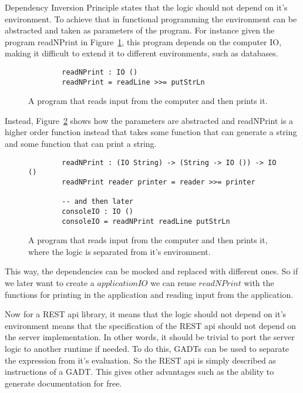 Dependency Inversion Principle states that the logic should not depend on it's
environment. To achieve that in functional programming the environment can
be abstracted and taken as parameters of the program. For instance given the
program readNPrint in Figure~\ref{diexample}, this program depends on the
computer IO, making it difficult to extend it to different environments, such as
databases. 

\begin{figure}[H]
    \begin{lstlisting}
        readNPrint : IO () 
        readNPrint = readLine >>= putStrLn
    \end{lstlisting}
    \caption{A program that reads input from the computer and then prints it.}
    \label{diexample}
\end{figure}

Instead, Figure~\ref{withdiexample} shows how the parameters are abstracted and
readNPrint is a higher order function instead that takes some function that
can generate a string and some function that can print a string.


\begin{figure}[H]
    \begin{lstlisting}
        readNPrint : (IO String) -> (String -> IO ()) -> IO ()
        readNPrint reader printer = reader >>= printer

        -- and then later
        consoleIO : IO ()
        consoleIO = readNPrint readLine putStrLn
    \end{lstlisting}
    \caption{A program that reads input from the computer and then prints it,
    where the logic is separated from it's environment.}
    \label{withdiexample}
\end{figure}

This way, the dependencies can be mocked and replaced with different ones. So if
we later want to create a $applicationIO$ we can reuse $readNPrint$ with the
functions for printing in the application and reading input from the
application.

Now for a REST api library, it means that the logic should not depend on it's
environment means that the specification of the REST api should not depend on
the server implementation. In other words, it should be trivial to port the
server logic to another runtime if needed. To do this, GADTs can be used to
separate the expression from it's evaluation. So the REST api is simply
described as instructions of a GADT. This gives other advantages such as the
ability to generate documentation for free.

